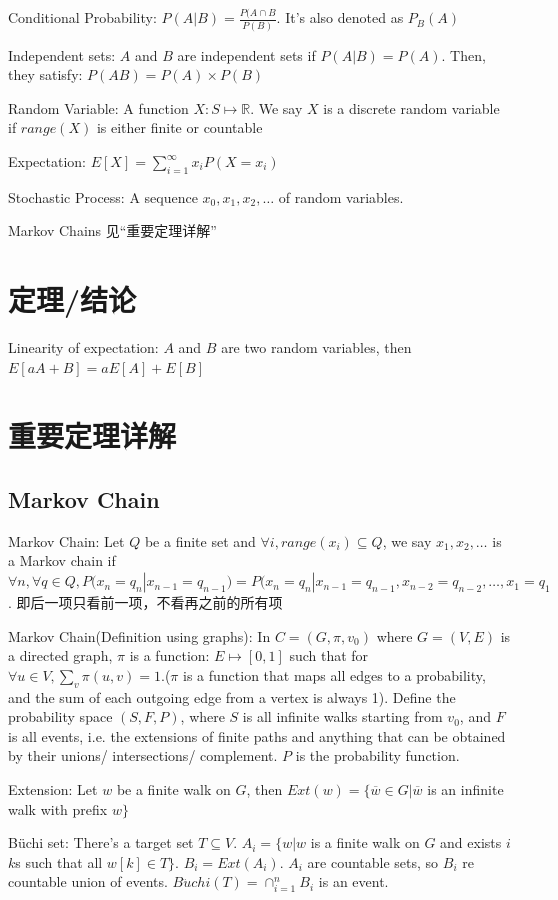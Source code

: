 \documentclass[12pt,a4paper]{ctexrep}
\begin{document}
Conditional Probability: $P(A|B) = \frac{P(A\cap B}{P(B)}$. It's also denoted as $P_B(A)$

Independent sets: $A$ and $B$ are independent sets if $P(A|B) = P(A)$. Then, they satisfy: $P(AB) = P(A)\times P(B)$

Random Variable: A function $X: S \mapsto \mathbb{R}$. We say $X$ is a discrete random variable if $range(X)$ is either finite or countable

Expectation: $E[X] = \sum_{i = 1}^{\infty} x_i P(X = x_i)$

Stochastic Process: A sequence $x_0,x_1,x_2,\dots$ of random variables.

Markov Chains 见“重要定理详解”
\section{定理/结论}
Linearity of expectation: $A$ and $B$ are two random variables, then $E[aA+B] = aE[A]+E[B]$
\section{重要定理详解}
\subsection{Markov Chain}
Markov Chain: Let $Q$ be a finite set and $\forall i, range(x_i) \subseteq Q$, we say $x_1,x_2,\dots$ is a Markov chain if $\forall n, \forall q \in Q, P(x_n = q_n|x_{n-1} = q_{n-1}) = P(x_n = q_n|x_{n-1} = q_{n-1},x_{n-2} = q_{n-2},\dots,x_{1} = q_{1}$. 即后一项只看前一项，不看再之前的所有项

Markov Chain(Definition using graphs): In $C = (G,\pi,v_0)$ where $G = (V,E)$ is a directed graph, $\pi$ is a function: $E\mapsto [0,1]$ such that for $\forall u \in V, \sum_{v} \pi(u,v) = 1$.($\pi$ is a function that maps all edges to a probability, and the sum of each outgoing edge from a vertex is always 1). Define the probability space $(S,F,P)$, where $S$ is all infinite walks starting from $v_0$, and $F$ is all events, i.e. the extensions of finite paths and anything that can be obtained by their unions/ intersections/ complement. $P$ is the probability function.

Extension: Let $w$ be a finite walk on $G$, then $Ext(w) = \{\overline{w} \in G| \overline{w}$ is an infinite walk with prefix $w\}$

B\"uchi set: There's a target set $T\subseteq V$. $A_i = \{w|w$ is a finite walk on $G$ and exists $i$ $k$s such that all $w[k] \in T\}$. $B_i = Ext(A_i)$. $A_i$ are countable sets, so $B_i$ re countable union of events. $B\ddot{u}chi(T) = \cap_{i=1}^n B_i$ is an event.
\end{document}
